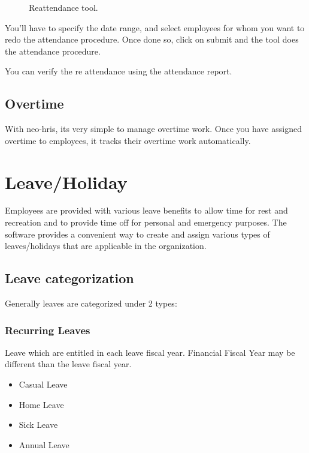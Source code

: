 \documentclass[letterpaper,10pt,english]{sphinxmanual}
\begin{document}
\begin{figure}[htbp]
\centering
\capstart

\noindent{}
\caption{Reattendance tool.}\label{\detokenize{attendance/troubleshooting:id2}}\end{figure}

You’ll have to specify the date range, and select employees for whom you want to redo the attendance procedure. Once done so, click on submit and the tool does the attendance procedure.

You can verify the re attendance using the attendance report.


\section{Overtime}
\label{\detokenize{attendance/overtime:overtime}}\label{\detokenize{attendance/overtime::doc}}\label{\detokenize{attendance/overtime:id1}}
With neo-hris, its very simple to manage overtime work. Once you have assigned overtime to employees, it tracks their overtime work automatically.


\chapter{Leave/Holiday}
\label{\detokenize{leave-holiday/leave-holiday:leave-holiday}}\label{\detokenize{leave-holiday/leave-holiday::doc}}\label{\detokenize{leave-holiday/leave-holiday:id1}}
Employees are provided with various leave benefits to allow time for rest and recreation and to provide time off for personal and emergency purposes.
The software provides a convenient way to create and assign various types of leaves/holidays that are applicable in the organization.


\section{Leave categorization}
\label{\detokenize{leave-holiday/leave-types::doc}}\label{\detokenize{leave-holiday/leave-types:leave-categorization}}
Generally leaves are categorized under 2 types:


\subsection{Recurring Leaves}
\label{\detokenize{leave-holiday/leave-types:recurring-leaves}}
Leave which are entitled in each leave fiscal year. Financial Fiscal Year may be different than the leave fiscal year.
\begin{itemize}
\item {} 
Casual Leave

\item {} 
Home Leave

\item {} 
Sick Leave

\item {} 
Annual Leave

\end{itemize}
\end{document}
